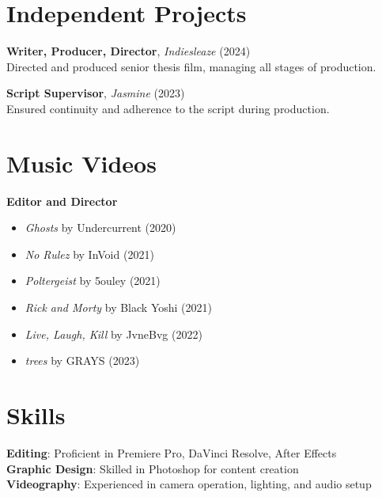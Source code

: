 \documentclass[letterpaper,11pt]{article}
\begin{document}
\section*{Independent Projects}
\textbf{Writer, Producer, Director}, \textit{Indiesleaze} (2024)\\
Directed and produced senior thesis film, managing all stages of production.

\textbf{Script Supervisor}, \textit{Jasmine} (2023)\\
Ensured continuity and adherence to the script during production.

\section*{Music Videos}
\textbf{Editor and Director}
\vspace{-0.8em}
\begin{itemize}
    \item \textit{Ghosts} by Undercurrent (2020)
    \item \textit{No Rulez} by InVoid (2021)
    \item \textit{Poltergeist} by 5ouley (2021)
    \item \textit{Rick and Morty} by Black Yoshi (2021)
    \item \textit{Live, Laugh, Kill} by JvneBvg (2022)
    \item \textit{trees} by GRAYS (2023)
\end{itemize}

\section*{Skills}
\textbf{Editing}: Proficient in Premiere Pro, DaVinci Resolve, After Effects\\
\textbf{Graphic Design}: Skilled in Photoshop for content creation\\
\textbf{Videography}: Experienced in camera operation, lighting, and audio setup
\end{document}
